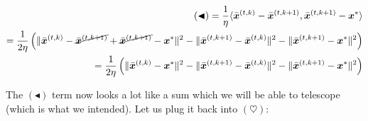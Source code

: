 \begin{align*}
    (\blacktriangleleft) = \frac{1}{\eta} \langle \bar{\bm{x}}^{(t,k)} - \bar{\bm{x}}^{(t,k+1)} ,\bar{\bm{x}}^{(t,k+1)} - \bm{x}^{*} \rangle \\
    = \frac{1}{2\eta} \left(\|  \bar{\bm{x}}^{(t,k)} - \cancel{\bar{\bm{x}}^{(t,k+1)}} + \cancel{\bar{\bm{x}}^{(t,k+1)}} - \bm{x}^{*} \|^2 - \|  \bar{\bm{x}}^{(t,k+1)} - \bar{\bm{x}}^{(t,k)} \|^2 - \| \bar{\bm{x}}^{(t,k+1)} - \bm{x}^{*} \|^2\right) \\
    = \frac{1}{2\eta} \left(\|  \bar{\bm{x}}^{(t,k)} - \bm{x}^{*} \|^2 - \|  \bar{\bm{x}}^{(t,k+1)} - \bar{\bm{x}}^{(t,k)} \|^2 - \| \bar{\bm{x}}^{(t,k+1)} - \bm{x}^{*} \|^2 \right)
\end{align*}

The $(\blacktriangleleft)$ term now looks a lot like a sum which we will be able to telescope (which is what we intended). Let us plug it back into $(\heartsuit)$:

